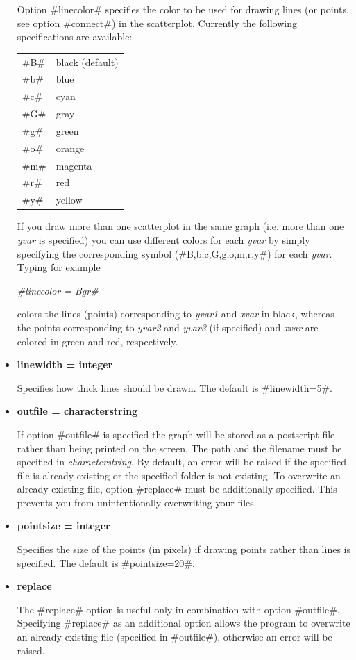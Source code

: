 \begin{itemize}
Option #linecolor# specifies the color to be used for drawing lines
(or points, see option #connect#) in the scatterplot. Currently the
following specifications are available:

\begin{tabular}{ll}
#B# & black (default) \\
#b# & blue \\
#c# & cyan \\
#G# & gray \\
#g# & green \\
#o# & orange \\
#m# & magenta \\
#r# & red \\
#y# & yellow
\end{tabular}

If you draw more than one scatterplot in the same graph (i.e. more
than one {\em yvar} is specified) you can use different colors for
each {\em yvar} by simply specifying the corresponding symbol
(#B,b,c,G,g,o,m,r,y#) for each {\em yvar}. Typing for example

{\em #linecolor = Bgr#}

colors the lines (points) corresponding to {\em yvar1} and {\em
xvar} in black, whereas the points corresponding to {\em yvar2} and
{\em yvar3} (if specified) and {\em xvar} are colored in green and
red, respectively.
\item {\bf linewidth = integer}

Specifies how thick lines should be drawn. The default is
#linewidth=5#.
\item {\bf outfile = characterstring}

If option #outfile# is specified the graph will be stored as a
postscript file rather than being printed on the screen. The path
and the filename must be specified in {\em characterstring}. By
default, an error will be raised if the specified file is already
existing or the specified folder is not existing. To overwrite  an
already existing file, option #replace# must be additionally
specified. This prevents you from unintentionally overwriting your
files.
\item {\bf pointsize = integer}

Specifies the size of the points (in pixels) if drawing points
rather than lines is specified. The default is #pointsize=20#.
\item {\bf replace}

The #replace# option is useful only in combination with option
#outfile#. Specifying #replace# as an additional option allows the
program to overwrite an already existing file (specified in
#outfile#), otherwise an error will be raised.


\end{itemize}
